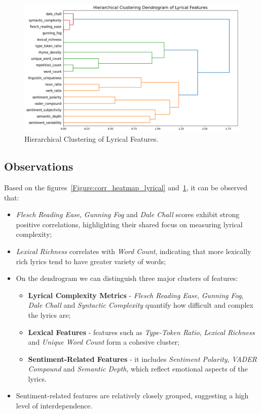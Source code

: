 \begin{center}
\begin{figure}[H]
  \centering
  \includegraphics[width=6in]{img/dendrogram_lyrical.png}
  \caption{Hierarchical Clustering of Lyrical Features.}
  \label{Figure:dendrogram_lyrical}
\end{figure}
\end{center}


\subsection*{Observations}
Based on the figures~\ref{Figure:corr_heatmap_lyrical}
and~\ref{Figure:dendrogram_lyrical}, it can be observed that:
\begin{itemize}
  \item \textit{Flesch Reading Ease}, \textit{Gunning Fog} and \textit{Dale
    Chall} scores exhibit strong positive correlations, highlighting their
    shared focus on measuring lyrical complexity;
  \item \textit{Lexical Richness} correlates with \textit{Word Count},
    indicating that more lexically rich lyrics tend to have  greater variety
    of words;
  \item On the dendrogram we can distinguish three major clusters of features:
    \begin{itemize}
      \item \textbf{Lyrical Complexity Metrics} - \textit{Flesch Reading Ease},
        \textit{Gunning Fog}, \textit{Dale Chall} and \textit{Syntactic
        Complexity } quantify how difficult and complex the lyrics are;
      \item  \textbf{Lexical Features} - features such as \textit{Type-Token
        Ratio}, \textit{Lexical Richness} and \textit{Unique Word Count} form a
        cohesive cluster;
      \item \textbf{Sentiment-Related Features} - it includes \textit{Sentiment
        Polarity}, \textit{VADER Compound} and \textit{Semantic Depth}, which
        reflect emotional aspects of the lyrics.
    \end{itemize}
  \item Sentiment-related features are relatively closely grouped, suggesting a
    high level of interdependence.
\end{itemize}


